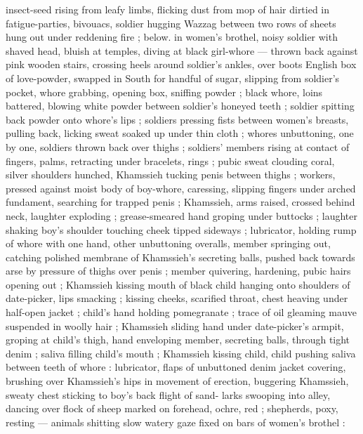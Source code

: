 insect-seed rising from leafy limbs, flicking dust from mop of hair dirtied in fatigue-parties,
bivouacs, soldier hugging Wazzag between two rows of %
sheets hung out under reddening fire ; below. in women's brothel, noisy soldier with shaved head,
bluish at temples, diving at black girl-whore --- thrown back against pink wooden stairs, crossing
heels around soldier's ankles, over boots {\dashcol} English box of love-powder, swapped in South
for handful of sugar, slipping from soldier's pocket, whore grabbing, opening box, sniffing powder ;
black whore, loins battered, blowing white powder between soldier's honeyed teeth ; soldier spitting
back powder onto whore's lips ; soldiers pressing fists between women's breasts, pulling back,
licking sweat soaked up under thin cloth ; whores unbuttoning, one by one, soldiers thrown back over
thighs ; soldiers' members rising at contact of fingers, palms, retracting under bracelets, rings ;
pubic sweat clouding coral, silver {\semislash} shoulders hunched, Khamssieh tucking penis between
thighs ; workers, pressed against moist body of boy-whore, caressing, slipping fingers under arched
fundament, searching for trapped penis ; Khamssieh, arms raised, crossed behind neck, laughter
exploding ; grease-smeared hand groping under buttocks ; laughter shaking boy's shoulder touching
cheek tipped sideways{\td}  ; lubricator, holding rump of whore with
one hand, other unbuttoning overalls, member springing out, catching polished membrane of
Khamssieh's secreting balls, pushed back towards arse by pressure of thighs over penis ; member
quivering, hardening, pubic hairs opening out ; Khamssieh kissing mouth of black child hanging onto
shoulders of date-picker, lips smacking ; kissing cheeks, scarified throat, chest heaving under
half-open jacket ; child's hand holding pomegranate ; trace of oil gleaming mauve suspended in
woolly hair ; Khamssieh sliding hand under date-picker's armpit, groping at child's thigh, hand
enveloping member, secreting balls, through tight denim ; saliva filling child's mouth ; Khamssieh
kissing child, child pushing saliva between teeth of whore : lubricator, flaps of unbuttoned denim
jacket covering, brushing over Khamssieh's hips in movement of erection, buggering Khamssieh, sweaty
chest sticking to boy's back {\slashsemi} flight of sand-%
larks swooping into alley, dancing over flock of sheep marked on forehead, ochre, red ; shepherds,
poxy, resting --- animals shitting {\dashcom} slow watery gaze fixed on bars of women's brothel :
